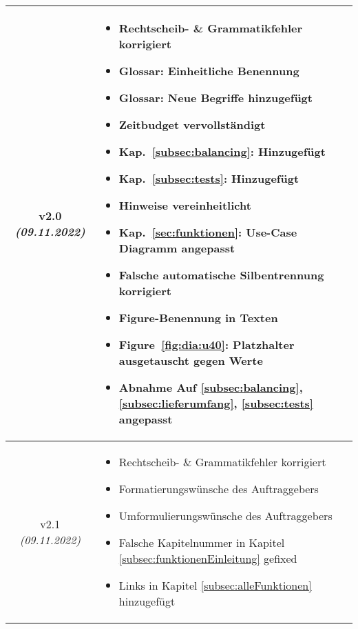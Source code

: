 \begin{xltabular}{\textwidth}{|c|X|}
    v2.0  \textit{(09.11.2022)} & \begin{itemize}
        \item Rechtscheib- \& Grammatikfehler korrigiert
        \item Glossar: Einheitliche Benennung
        \item Glossar: Neue Begriffe hinzugefügt
        \item Zeitbudget vervollständigt
        \item Kap.~\ref{subsec:balancing}: Hinzugefügt
        \item Kap.~\ref{subsec:tests}: Hinzugefügt
        \item Hinweise vereinheitlicht
        \item Kap.~\ref{sec:funktionen}: Use-Case Diagramm angepasst
        \item Falsche automatische Silbentrennung korrigiert
        \item Figure-Benennung in Texten
        \item Figure~\ref{fig:dia:u40}: Platzhalter ausgetauscht gegen Werte
        \item Abnahme Auf \ref{subsec:balancing}, \ref{subsec:lieferumfang}, \ref{subsec:tests} angepasst
    \end{itemize}
    \\ \hline

    v2.1  \textit{(09.11.2022)} & \begin{itemize}
        \item Rechtscheib- \& Grammatikfehler korrigiert
        \item Formatierungswünsche des Auftraggebers
        \item Umformulierungswünsche des Auftraggebers
        \item Falsche Kapitelnummer in Kapitel \ref{subsec:funktionenEinleitung} gefixed
        \item Links in Kapitel \ref{subsec:alleFunktionen} hinzugefügt

    \end{itemize}
    \\ \hline


\end{xltabular}

% 
% 
% 
% 
% 
% 
% 
% 
% 
% 
% 
% 
% 
% 
% 

